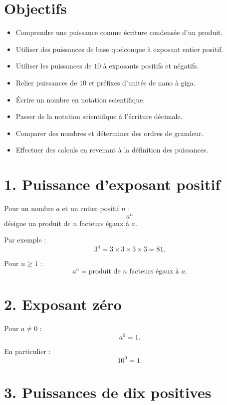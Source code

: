 
\section{Objectifs}

\begin{itemize}
\item Comprendre une puissance comme écriture condensée d'un produit.
\item Utiliser des puissances de base quelconque à exposant entier positif.
\item Utiliser les puissances de $10$ à exposants positifs et négatifs.
\item Relier puissances de $10$ et préfixes d'unités de nano à giga.
\item Écrire un nombre en notation scientifique.
\item Passer de la notation scientifique à l'écriture décimale.
\item Comparer des nombres et déterminer des ordres de grandeur.
\item Effectuer des calculs en revenant à la définition des puissances.
\end{itemize}

\section{1. Puissance d'exposant positif}

Pour un nombre $a$ et un entier positif $n$ :
\[
a^n
\]
désigne un produit de $n$ facteurs égaux à $a$.

Par exemple :
\[
3^4=3\times3\times3\times3=81.
\]

\begin{definition}
Pour $n\ge1$ :
\[
\boxed{a^n=\text{produit de }n\text{ facteurs égaux à }a}.
\]
\end{definition}

\section{2. Exposant zéro}

Pour $a\neq0$ :
\[
\boxed{a^0=1}.
\]

En particulier :
\[
10^0=1.
\]

\section{3. Puissances de dix positives}

